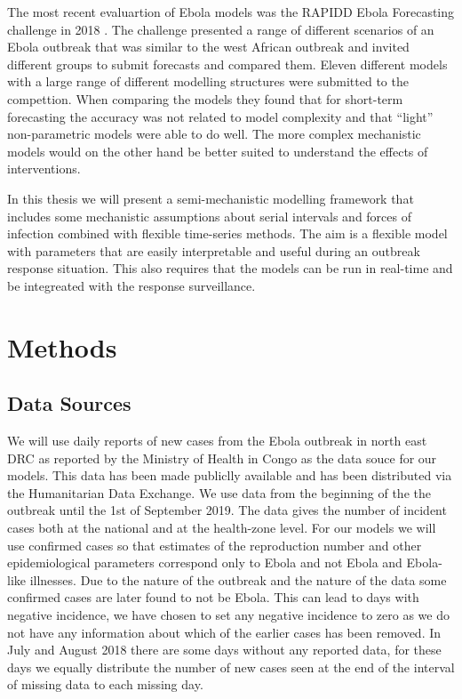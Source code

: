 \documentclass[12pt]{article}
\begin{document}
The most recent evaluartion of Ebola models was the RAPIDD Ebola Forecasting challenge in 2018 \cite{viboudRAPIDDEbolaForecasting2018}. The challenge presented a range of different scenarios of an Ebola outbreak that was similar to the west African outbreak and invited different groups to submit forecasts and compared them. Eleven different models with a large range of different modelling structures were submitted to the compettion. When comparing the models they found that for short-term forecasting the accuracy was not related to model complexity and that ``light'' non-parametric models were able to do well. The more complex mechanistic models would on the other hand be better suited to understand the effects of interventions. 

In this thesis we will present a semi-mechanistic modelling framework that includes some mechanistic assumptions about serial intervals and forces of infection combined with flexible time-series methods. The aim is a flexible model with parameters that are easily interpretable and useful during an outbreak response situation. This also requires that the models can be run in real-time and be integreated with the response surveillance. 

\section{Methods}

\subsection{Data Sources}

We will use daily reports of new cases from the Ebola outbreak in north east DRC as reported by the Ministry of Health in Congo as the data souce for our models. This data has been made publiclly available and has been distributed via the Humanitarian Data Exchange\cite{hummanitariandataexchangeEbolaCasesDeaths}. We use data from the beginning of the the outbreak until the 1st of September 2019. The data gives the number of incident cases both at the national and at the health-zone level. For our models we will use confirmed cases so that estimates of the reproduction number and other epidemiological parameters correspond only to Ebola and not Ebola and Ebola-like illnesses. Due to the nature of the outbreak and the nature of the data some confirmed cases are later found to not be Ebola. This can lead to days with negative incidence, we have chosen to set any negative incidence to zero as we do not have any information about which of the earlier cases has been removed. In July and August 2018 there are some days without any reported data, for these days we equally distribute the number of new cases seen at the end of the interval of missing data to each missing day. 
\end{document}
